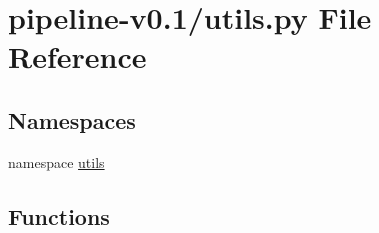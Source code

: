 \hypertarget{pipeline-v0_81_2utils_8py}{\section{pipeline-\/v0.1/utils.py \-File \-Reference}
\label{pipeline-v0_81_2utils_8py}
}
\subsection*{\-Namespaces}
\begin{DoxyCompactItemize}
\item 
namespace \hyperlink{namespaceutils}{utils}
\end{DoxyCompactItemize}
\subsection*{\-Functions}
